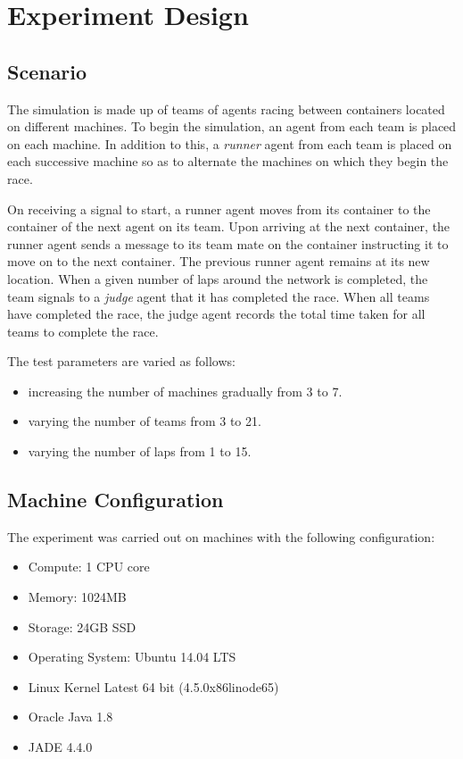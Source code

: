 \documentclass[11pt,titlepage]{article}
\begin{document}
\section{Experiment Design}

\subsection{Scenario}

The simulation is made up of teams of agents racing between containers located on different machines. To begin the simulation, an agent from each team is placed on each machine. In addition to this, a \emph{runner} agent from each team is placed on each successive machine so as to alternate the machines on which they begin the race.

On receiving a signal to start, a runner agent moves from its container to the container of the next agent on its team. Upon arriving at the next container, the runner agent sends a message to its team mate on the container instructing it to move on to the next container. The previous runner agent remains at its new location. When a given number of laps around the network is completed, the team signals to a \emph{judge} agent that it has completed the race. When all teams have completed the race, the judge agent records the total time taken for all teams to complete the race.

The test parameters are varied as follows:

\begin{itemize}
	\item increasing the number of machines gradually from 3 to 7.
	\item varying the number of teams from 3 to 21.
	\item varying the number of laps from 1 to 15.
\end{itemize}

\subsection{Machine Configuration}
The experiment was carried out on machines with the following configuration:

\begin{itemize}
	\item Compute: 1 CPU core
	\item Memory: 1024MB
	\item Storage: 24GB SSD
	\item Operating System: Ubuntu 14.04 LTS
	\item Linux Kernel Latest 64 bit (4.5.0\textendash x86\textendash linode65)
	\item Oracle Java 1.8
	\item JADE 4.4.0
\end{itemize}
\end{document}
